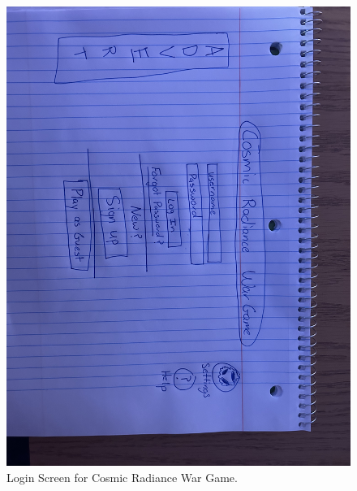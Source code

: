 \begin{figure}
    \centering
    \includegraphics[width=1\linewidth]{figures/Login UI.jpeg}
    \caption{Login Screen for Cosmic Radiance War Game.}
    \label{fig:enter-label}
\end{figure}


